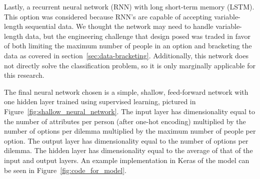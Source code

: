 \documentclass[paper=a4paper]{report}
\begin{document}
Lastly, a recurrent neural network (RNN) with long short-term memory (LSTM). This option was
considered because RNN's are capable of accepting variable-length sequential data. We thought the
network may need to handle variable-length data, but the engineering challenge that design posed was
traded in favor of both limiting the maximum number of people in an option and bracketing the data
as covered in section~\ref{sec:data-bracketing}. Additionally, this network does not directly solve
the classification problem, so it is only marginally applicable for this research.

The final neural network chosen is a simple, shallow, feed-forward network with one hidden layer
trained using supervised learning, pictured in Figure~\ref{fig:shallow_neural_network}. The input
layer has dimensionality equal to the number of attributes per person (after one-hot encoding)
multiplied by the number of options per dilemma multiplied by the maximum number of people per
option. The output layer has dimensionality equal to the number of options per dilemma. The hidden
layer has dimensionality equal to the average of that of the input and output layers. An example
implementation in Keras of the model can be seen in Figure~\ref{fig:code_for_model}.
\end{document}
